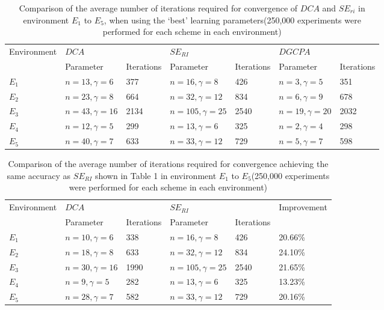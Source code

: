 \begin{table}
\caption{Comparison of the average number of iterations required for convergence of $DCA$ and $SE_{ri}$ in environment $E_1$ to $E_5$, when using the ‘best’ learning parameters(250,000 experiments were performed for each scheme in each environment)}
\label{tab:2}       %
\begin{tabular}{lllllll}
\hline\noalign{\smallskip}
Environment & $DCA$ &   & $SE_{RI}$ &   & $DGCPA$ &\\
\cline{2-3}\cline{4-5}\cline{6-7}
  & Parameter & Iterations & Parameter & Iterations & Parameter & Iterations\\
\cline{1-7}
$E_1$ & $n=13 ,\gamma=6 $ & 377  & $n=16 ,\gamma=8 $ & 426 & $n=3 ,\gamma=5 $ & 351  \\
$E_2$ & $n=23 ,\gamma=8 $ &  664 & $n=32 ,\gamma=12$ &  834 & $n=6 ,\gamma=9 $ & 678 \\
$E_3$ & $n=43 ,\gamma=16 $ &  2134 & $n=105 ,\gamma=25 $ & 2540 & $n=19 ,\gamma=20 $ & 2032  \\
$E_4$ & $n=12 ,\gamma=5 $ & 299  & $n=13 ,\gamma=6 $ & 325 & $n=2 ,\gamma=4 $ & 298  \\
$E_5$ & $n=40 ,\gamma=7 $ &  633 & $n=33 ,\gamma=12 $ & 729 & $n=5 ,\gamma=7 $ & 598  \\
\cline{1-7}
\end{tabular}
\end{table}

\begin{table}
\caption{Comparison of the average number of iterations required for convergence achieving the same accuracy as $SE_{RI}$ shown in Table 1 in environment $E_1$ to $E_5$(250,000 experiments were performed for each scheme in each environment)}
\label{tab:3}       %
\begin{tabular}{llllll}
\hline\noalign{\smallskip}
Environment & $DCA$ &   & $SE_{RI}$ &   & Improvement\\
\cline{2-3}\cline{4-5}
  & Parameter & Iterations & Parameter & Iterations\\
\cline{1-6}
$E_1$ & $n=10 ,\gamma=6 $ & 338 & $n=16 ,\gamma=8 $ & 426 & 20.66\%\\
$E_2$ & $n=18 ,\gamma=8 $ &  633 & $n=32 ,\gamma=12 $ &  834 & 24.10\%\\
$E_3$ & $n=30 ,\gamma=16 $ & 1990 & $n=105 ,\gamma=25 $ &  2540 & 21.65\%\\
$E_4$ & $n=9 ,\gamma=5 $ & 282 & $n=13 ,\gamma=6 $ & 325 & 13.23\%\\
$E_5$ & $n= 28,\gamma=7 $ & 582 & $n=33 ,\gamma=12 $ & 729 & 20.16\%\\
\cline{1-6}
\end{tabular}
\end{table}

